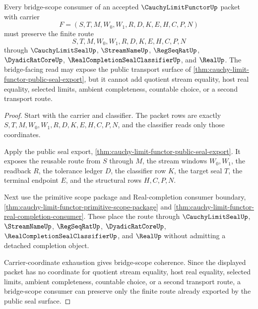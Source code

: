 \begin{theorem}
\label{thm:cauchy-limit-functor-bridge-scope-coherence}
Every bridge-scope consumer of an accepted $\CauchyLimitFunctorUp$ packet with carrier
$$
F=(S,T,M,W_0,W_1,R,D,K,E,H,C,P,N)
$$
must preserve the finite route
$$
S,T,M,W_0,W_1,R,D,K,E,H,C,P,N
$$
through $\CauchyLimitSealUp$, $\StreamNameUp$, $\RegSeqRatUp$, $\DyadicRatCoreUp$, $\RealCompletionSealClassifierUp$, and $\RealUp$. The bridge-facing read may expose the public transport surface of \autoref{thm:cauchy-limit-functor-public-seal-export}, but it cannot add quotient stream equality, host real equality, selected limits, ambient completeness, countable choice, or a second transport route.
\end{theorem}
\begin{proof}
Start with the carrier and classifier. The packet rows are exactly $S,T,M,W_0,W_1,R,D,K,E,H,C,P,N$, and the classifier reads only those coordinates.

Apply the public seal export, \autoref{thm:cauchy-limit-functor-public-seal-export}. It exposes the reusable route from $S$ through $M$, the stream windows $W_0,W_1$, the readback $R$, the tolerance ledger $D$, the classifier row $K$, the target seal $T$, the terminal endpoint $E$, and the structural rows $H,C,P,N$.

Next use the primitive scope package and Real-completion consumer boundary, \autoref{thm:cauchy-limit-functor-primitive-scope-package} and \autoref{thm:cauchy-limit-functor-real-completion-consumer}. These place the route through $\CauchyLimitSealUp$, $\StreamNameUp$, $\RegSeqRatUp$, $\DyadicRatCoreUp$, $\RealCompletionSealClassifierUp$, and $\RealUp$ without admitting a detached completion object.

Carrier-coordinate exhaustion gives bridge-scope coherence. Since the displayed packet has no coordinate for quotient stream equality, host real equality, selected limits, ambient completeness, countable choice, or a second transport route, a bridge-scope consumer can preserve only the finite route already exported by the public seal surface.
\end{proof}

